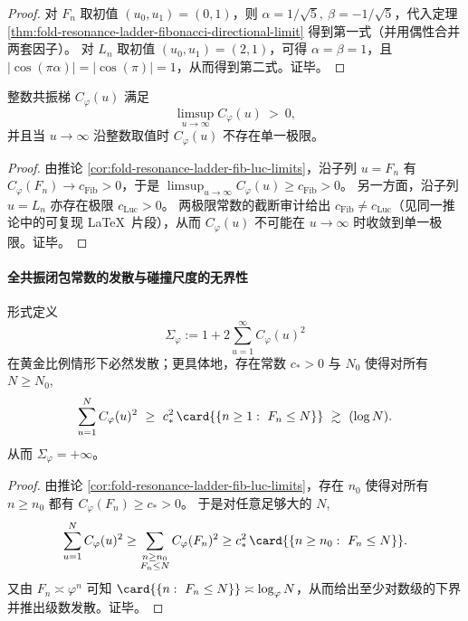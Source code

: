 \begin{proof}
对 \(F_n\) 取初值 \((u_0,u_1)=(0,1)\)，则
\(
\alpha=1/\sqrt5,\ \beta=-1/\sqrt5
\)，代入定理 \ref{thm:fold-resonance-ladder-fibonacci-directional-limit} 得到第一式（并用偶性合并两套因子）。
对 \(L_n\) 取初值 \((u_0,u_1)=(2,1)\)，可得
\(
\alpha=\beta=1
\)，且 \(|\cos(\pi\alpha)|=|\cos(\pi)|=1\)，从而得到第二式。证毕。
\end{proof}

\begin{corollary}[整数方向的非衰减与无单一极限]\label{cor:fold-resonance-ladder-no-decay-no-limit}
整数共振梯 \(C_\varphi(u)\) 满足
\[
\limsup_{u\to\infty}C_\varphi(u)\ >\ 0,
\]
并且当 \(u\to\infty\) 沿整数取值时 \(C_\varphi(u)\) 不存在单一极限。
\end{corollary}

\begin{proof}
由推论 \ref{cor:fold-resonance-ladder-fib-luc-limits}，沿子列 \(u=F_n\) 有 \(C_\varphi(F_n)\to c_{\mathrm{Fib}}>0\)，于是 \(\limsup_{u\to\infty}C_\varphi(u)\ge c_{\mathrm{Fib}}>0\)。
另一方面，沿子列 \(u=L_n\) 亦存在极限 \(c_{\mathrm{Luc}}>0\)。
两极限常数的截断审计给出 \(c_{\mathrm{Fib}}\neq c_{\mathrm{Luc}}\)（见同一推论中的可复现 \LaTeX\ 片段），从而 \(C_\varphi(u)\) 不可能在 \(u\to\infty\) 时收敛到单一极限。证毕。
\end{proof}

\paragraph{全共振闭包常数的发散与碰撞尺度的无界性}
\begin{theorem}\label{thm:fold-sigma-phi-diverges}
形式定义
\[
\Sigma_\varphi:=1+2\sum_{u=1}^{\infty}C_\varphi(u)^2
\]
在黄金比例情形下必然发散；更具体地，存在常数 \(c_*>0\) 与 \(N_0\) 使得对所有 \(N\ge N_0\),
\[
\sum_{u=1}^{N}C_\varphi(u)^2\ \ge\ c_*^2\,\card{\{n\ge 1:\ F_n\le N\}}\ \gtrsim\ (\log N).
\]
从而 \(\Sigma_\varphi=+\infty\)。
\end{theorem}

\begin{proof}
由推论 \ref{cor:fold-resonance-ladder-fib-luc-limits}，存在 \(n_0\) 使得对所有 \(n\ge n_0\) 都有 \(C_\varphi(F_n)\ge c_*>0\)。
于是对任意足够大的 \(N\),
\[
\sum_{u=1}^{N}C_\varphi(u)^2
\ge
\sum_{\substack{n\ge n_0\\ F_n\le N}}C_\varphi(F_n)^2
\ge
c_*^2\,\card{\{n\ge n_0:\ F_n\le N\}}.
\]
又由 \(F_n\asymp \varphi^n\) 可知 \(\card{\{n:\ F_n\le N\}}\asymp \log_\varphi N\)，从而给出至少对数级的下界并推出级数发散。证毕。
\end{proof}


